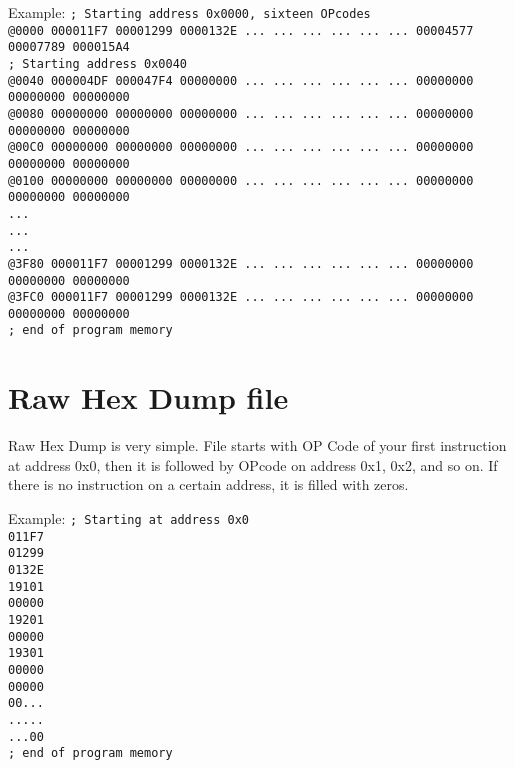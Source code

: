     Example:
    {
        \usecodefont
        \verb'; Starting address 0x0000, sixteen OPcodes'\\
        \verb'@0000 000011F7 00001299 0000132E ... ... ... ... ... ... 00004577 00007789 000015A4'\\
        \verb'; Starting address 0x0040'\\
        \verb'@0040 000004DF 000047F4 00000000 ... ... ... ... ... ... 00000000 00000000 00000000'\\
        \verb'@0080 00000000 00000000 00000000 ... ... ... ... ... ... 00000000 00000000 00000000'\\
        \verb'@00C0 00000000 00000000 00000000 ... ... ... ... ... ... 00000000 00000000 00000000'\\
        \verb'@0100 00000000 00000000 00000000 ... ... ... ... ... ... 00000000 00000000 00000000'\\
        \verb'...'\\
        \verb'...'\\
        \verb'...'\\
        \verb'@3F80 000011F7 00001299 0000132E ... ... ... ... ... ... 00000000 00000000 00000000'\\
        \verb'@3FC0 000011F7 00001299 0000132E ... ... ... ... ... ... 00000000 00000000 00000000'\\
        \verb'; end of program memory'\\
    }

\section{Raw Hex Dump file}
    Raw Hex Dump is very simple. File starts with OP Code of your first instruction at address 0x0, then it is followed by OPcode on address 0x1, 0x2, and so on. If there is no instruction on a certain address, it is filled with zeros.

    Example:
    {
        \usecodefont
        \verb'; Starting at address 0x0'\\
        \verb'011F7'\\
        \verb'01299'\\
        \verb'0132E'\\
        \verb'19101'\\
        \verb'00000'\\
        \verb'19201'\\
        \verb'00000'\\
        \verb'19301'\\
        \verb'00000'\\
        \verb'00000'\\
        \verb'00...'\\
        \verb'.....'\\
        \verb'...00'\\
        \verb'; end of program memory'\\
    }

